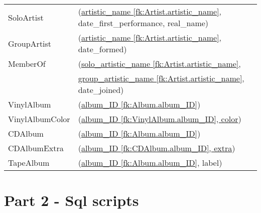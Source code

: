 \documentclass[11pt,a4paper]{article}
\newcommand{\includesqloutput}[1]{\tiny  \normalsize}
\begin{document}
\begin{table}[h]
\begin{tabular}{ll}
SoloArtist	    & 	 (\underline{artistic\_name [fk:Artist.artistic\_name]}, date\_first\_performance, real\_name) \\

GroupArtist	    & 	 (\underline{artistic\_name [fk:Artist.artistic\_name]}, date\_formed) \\

MemberOf    & (\underline{solo\_artistic\_name [fk:Artist.artistic\_name], }\\
 & \underline{group\_artistic\_name [fk:Artist.artistic\_name]}, date\_joined)\\
 
 VinylAlbum  &  (\underline{album\_ID [fk:Album.album\_ID]}) \\

VinylAlbumColor & (\underline{album\_ID [fk:VinylAlbum.album\_ID], color}) \\

 CDAlbum  &  (\underline{album\_ID [fk:Album.album\_ID]}) \\

CDAlbumExtra & (\underline{album\_ID [fk:CDAlbum.album\_ID], extra}) \\

 TapeAlbum  &  (\underline{album\_ID [fk:Album.album\_ID]}, label) 
\end{tabular}
\end{table}

\section{Part 2 - Sql scripts}

\includesqloutput{sqlScripts/create-Orinoco-extended-tables.sql}

\includesqloutput{sqlScripts/drop-Orinoco-extended-tables.sql}
\end{document}

